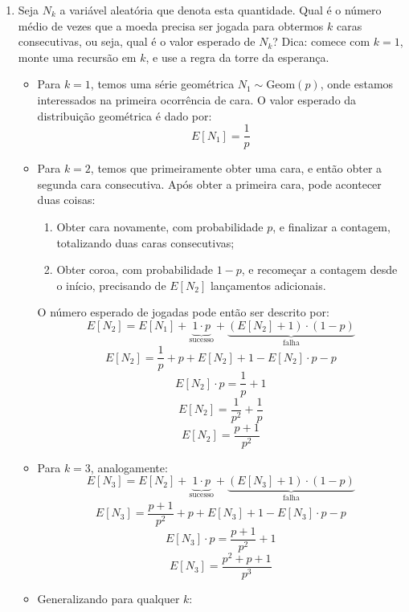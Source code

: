 \documentclass[12 pt]{article}
\begin{document}
\begin{enumerate}
    \item Seja $N_k$ a variável aleatória que denota esta quantidade. Qual é o número médio de vezes que a moeda precisa ser jogada para obtermos $k$ caras consecutivas, ou seja, qual é o valor esperado de $N_k$? Dica: comece com $k = 1$, monte uma recursão em $k$, e use a regra da torre da esperança.
    \begin{tcolorbox}[colframe=black, title=Resposta:]
        \begin{itemize}
            \item Para $k = 1$, temos uma série geométrica $N_1 \sim \text{Geom}(p)$, onde estamos interessados na primeira ocorrência de cara. O valor esperado da distribuição geométrica é dado por:
            $$E[N_1] = \frac{1}{p}$$ 
        
            \item Para $k=2$, temos que primeiramente obter uma cara, e então obter a segunda cara consecutiva. Após obter a primeira cara, pode acontecer duas coisas:
            \begin{enumerate}[label=\arabic*.]
                \item Obter cara novamente, com probabilidade $p$, e finalizar a contagem, totalizando duas caras consecutivas;
                \item Obter coroa, com probabilidade $1-p$, e recomeçar a contagem desde o início, precisando de $E[N_2]$ lançamentos adicionais.
            \end{enumerate}
            O número esperado de jogadas pode então ser descrito por:
            $$E[N_2] = E[N_1] + \underbrace{1\cdot p}_{\text{sucesso}} + \underbrace{(E[N_2] + 1) \cdot (1-p)}_{\text{falha}}$$
            $$E[N_2] = \frac{1}{p} + p + E[N_2] + 1 - E[N_2] \cdot p - p$$
            $$E[N_2] \cdot p = \frac{1}{p} + 1$$
            $$E[N_2] = \frac{1}{p^2} + \frac{1}{p}$$
            $$E[N_2] = \frac{p+1}{p^2}$$
        \end{itemize}
    \end{tcolorbox}
    \newpage
    \begin{tcolorbox}[colframe=black, title=Resposta(continuação):]
        \begin{itemize}
            \item Para $k=3$, analogamente:
            $$E[N_3] = E[N_2] + \underbrace{1\cdot p}_{\text{sucesso}} + \underbrace{(E[N_3] + 1) \cdot (1-p)}_{\text{falha}}$$
            $$E[N_3] = \frac{p+1}{p^2} + p + E[N_3] + 1 - E[N_3] \cdot p - p$$
            $$E[N_3] \cdot p = \frac{p+1}{p^2} + 1$$
            $$E[N_3] = \frac{p^2 + p + 1}{p^3}$$
            \item Generalizando para qualquer $k$:
            

\end{itemize}
\end{tcolorbox}
\end{enumerate}
\end{document}

